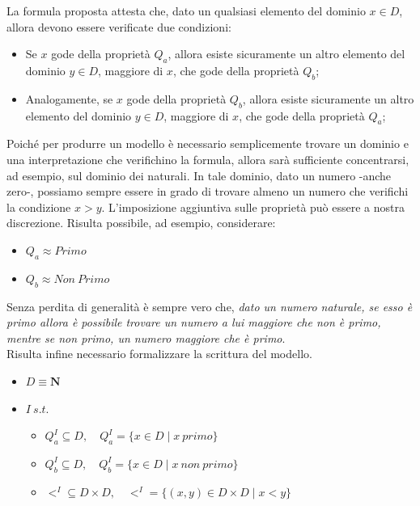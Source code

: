 \documentclass[a4paper,10pt]{article}
\begin{document}
{\begin{itemize}[label=, leftmargin=0pt]
\begin{osservazioni}
    La formula proposta attesta che, dato un qualsiasi elemento del dominio $x\in D$, allora devono essere verificate due condizioni:
    \begin{itemize}
        \item Se $x$ gode della proprietà $Q_a$, allora esiste sicuramente un altro elemento del dominio $y\in D$, maggiore di $x$, che gode della proprietà $Q_b$;
        \item Analogamente, se $x$ gode della proprietà $Q_b$, allora esiste sicuramente un altro elemento del dominio $y\in D$, maggiore di $x$, che gode della proprietà $Q_a$;
    \end{itemize}
    Poiché per produrre un modello è necessario semplicemente trovare un dominio e una interpretazione che verifichino la formula, allora sarà sufficiente concentrarsi, ad esempio, sul dominio dei naturali. In tale dominio, dato un numero -anche zero-, possiamo sempre essere in grado di trovare almeno un numero che verifichi la condizione $x>y$. L'imposizione aggiuntiva sulle proprietà può essere a nostra discrezione. Risulta possibile, ad esempio, considerare:
    \begin{itemize}
        \item $Q_a \approx Primo$
        \item $Q_b \approx Non\ Primo$
    \end{itemize}
    Senza perdita di generalità è sempre vero che, \textit{dato un numero naturale, se esso è primo allora è possibile trovare un numero a lui maggiore che non è primo, mentre se non primo, un numero maggiore che è primo}.\\

    Risulta infine necessario formalizzare la scrittura del modello.
    \begin{itemize}
        \item $D \equiv  \mathbf{N}$
        \item $I\ s.t.$
        \begin{itemize}
            \item $Q_a^I \subseteq D,\quad Q_a^I=\{x \in D\mid x\ primo\}$
            \item $Q_b^I \subseteq D,\quad Q_b^I=\{x \in D\mid x\ non\ primo\}$
            \item $<^I \subseteq D\times D,\quad <^I=\{(x,y) \in D\times D \mid x<y\}$\\
        \end{itemize}
    \end{itemize}


\end{osservazioni}
\end{itemize}}
\end{document}
